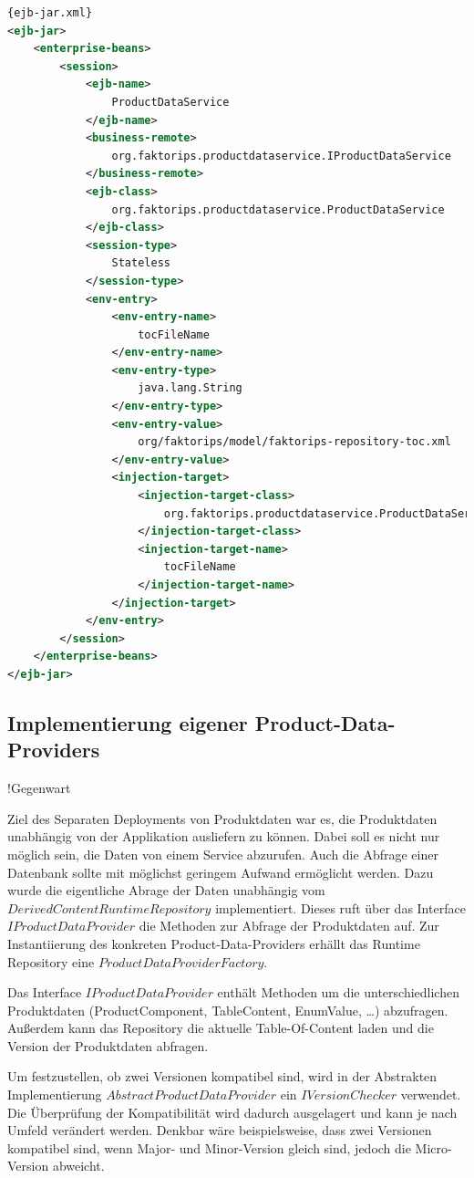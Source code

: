 \documentclass[headsepline=true, footsepline=true]{scrartcl}
\begin{document}
\begin{lstlisting}[caption=Beispiel einer ejb-jar.xml, label=ejb-jar.xml,language=XML]{ejb-jar.xml}
<ejb-jar>
	<enterprise-beans>
		<session>
			<ejb-name>
				ProductDataService
			</ejb-name>
			<business-remote>
				org.faktorips.productdataservice.IProductDataService
			</business-remote>
			<ejb-class>
				org.faktorips.productdataservice.ProductDataService
			</ejb-class>
			<session-type>
				Stateless
			</session-type>
			<env-entry>
				<env-entry-name>
					tocFileName
				</env-entry-name>
				<env-entry-type>
					java.lang.String
				</env-entry-type>
				<env-entry-value>
					org/faktorips/model/faktorips-repository-toc.xml
				</env-entry-value>
				<injection-target>
					<injection-target-class>
						org.faktorips.productdataservice.ProductDataService
					</injection-target-class>
					<injection-target-name>
						tocFileName
					</injection-target-name>
				</injection-target>
			</env-entry>
		</session>
	</enterprise-beans>
</ejb-jar>
\end{lstlisting}

\subsection{Implementierung eigener Product-Data-Providers}

!Gegenwart

Ziel des Separaten Deployments von Produktdaten war es, die Produktdaten
unabhängig von der Applikation ausliefern zu können. Dabei soll es nicht nur
möglich sein, die Daten von einem Service abzurufen. Auch die Abfrage einer
Datenbank sollte mit möglichst geringem Aufwand ermöglicht werden. Dazu wurde die
eigentliche Abrage der Daten unabhängig vom $DerivedContentRuntimeRepository$
implementiert. Dieses ruft über das Interface $IProductDataProvider$ die
Methoden zur Abfrage der Produktdaten auf. Zur Instantiierung des konkreten
Product-Data-Providers erhällt das Runtime Repository eine
$ProductDataProviderFactory$.

Das Interface $IProductDataProvider$ enthält Methoden um die unterschiedlichen
Produktdaten (ProductComponent, TableContent, EnumValue, \ldots) abzufragen.
Außerdem kann das Repository die aktuelle Table-Of-Content laden und die Version
der Produktdaten abfragen.

Um festzustellen, ob zwei Versionen kompatibel sind, wird in der Abstrakten
Implementierung $AbstractProductDataProvider$ ein $IVersionChecker$ verwendet.
Die Überprüfung der Kompatibilität wird dadurch ausgelagert und kann je nach
Umfeld verändert werden. Denkbar wäre beispielsweise, dass zwei Versionen
kompatibel sind, wenn Major- und Minor-Version gleich sind, jedoch die
Micro-Version abweicht.
\end{document}
